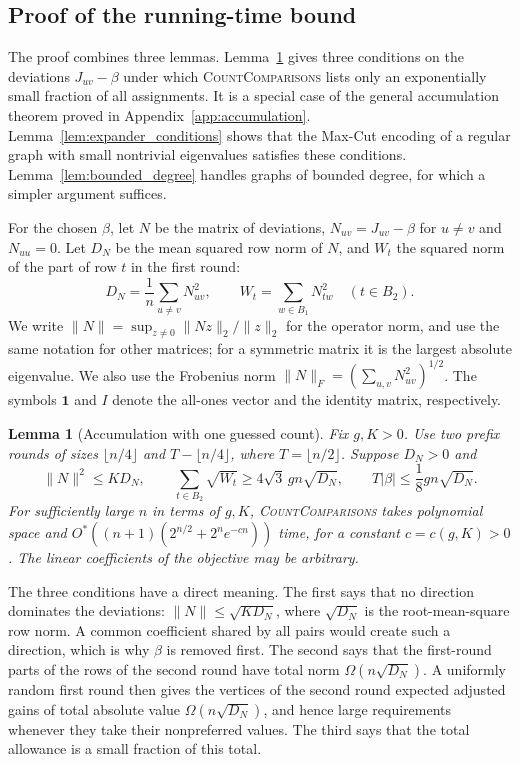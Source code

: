 \documentclass[11pt,a4paper]{article}
\newtheorem{lemma}[theorem]{Lemma}
\theoremstyle{definition}
\theoremstyle{remark}
\newcommand{\Ostar}{O^{*}}
\newcommand{\ind}{\mathbf 1}
\begin{document}
\subsection{Proof of the running-time bound}

The proof combines three lemmas. Lemma~\ref{lem:count_accumulation} gives
three conditions on the deviations $J_{uv}-\beta$ under which
\textnormal{\textsc{CountComparisons}} lists only an exponentially small
fraction of all assignments. It is a special case of the general
accumulation theorem proved in Appendix~\ref{app:accumulation}.
Lemma~\ref{lem:expander_conditions} shows that the Max-Cut encoding of a
regular graph with small nontrivial eigenvalues satisfies these
conditions. Lemma~\ref{lem:bounded_degree} handles graphs of bounded
degree, for which a simpler argument suffices.

For the chosen $\beta$, let $N$ be the matrix of deviations,
$N_{uv}=J_{uv}-\beta$ for $u\ne v$ and $N_{uu}=0$. Let $D_N$ be the mean
squared row norm of $N$, and $W_t$ the squared norm of the part of row $t$
in the first round:
\[
 D_N=\frac1n\sum_{u\ne v}N_{uv}^2,\qquad
 W_t=\sum_{w\in B_1}N_{tw}^2\quad(t\in B_2).
\]
We write $\|N\|=\sup_{z\ne0}\|Nz\|_2/\|z\|_2$ for the operator norm,
and use the same notation for other matrices; for a symmetric matrix it is
the largest absolute eigenvalue. We also use the Frobenius norm
$\|N\|_F=(\sum_{u,v}N_{uv}^2)^{1/2}$. The symbols $\ind$ and $I$
denote the all-ones vector and the identity matrix, respectively.

\begin{lemma}[Accumulation with one guessed count]\label{lem:count_accumulation}
Fix $g,K>0$. Use two prefix rounds of sizes $\lfloor n/4\rfloor$ and
$T-\lfloor n/4\rfloor$, where $T=\lfloor n/2\rfloor$. Suppose $D_N>0$ and
\[
 \|N\|^2\le KD_N,\qquad
 \sum_{t\in B_2}\sqrt{W_t}\ge4\sqrt3\,gn\sqrt{D_N},\qquad
 T|\beta|\le\frac18gn\sqrt{D_N}.
\]
For sufficiently large $n$ in terms of $g,K$,
\textnormal{\textsc{CountComparisons}} takes polynomial space and
$\Ostar((n+1)(2^{n/2}+2^ne^{-cn}))$ time, for a constant $c=c(g,K)>0$.
The linear coefficients of the objective may be arbitrary.
\end{lemma}

The three conditions have a direct meaning. The first says that no
direction dominates the deviations: $\|N\|\le\sqrt{KD_N}$, where
$\sqrt{D_N}$ is the root-mean-square row norm. A common coefficient shared
by all pairs would create such a direction, which is why $\beta$ is removed
first. The second says that the first-round parts of the rows of the
second round have total norm $\Omega(n\sqrt{D_N})$. A uniformly random
first round then gives the vertices of the second round expected adjusted
gains of total absolute value $\Omega(n\sqrt{D_N})$, and hence large
requirements whenever they take their nonpreferred values. The third says
that the total allowance is a small fraction of this total.
\end{document}
